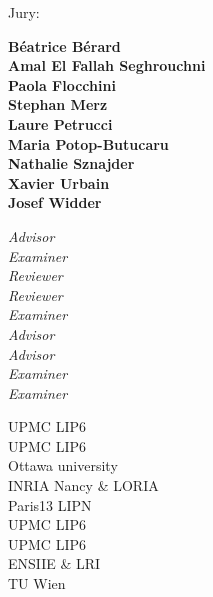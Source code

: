 \begin{titlepage}
\vfill
\begin{center}
\noindent \large
{\normalsize
\begin{flushleft}
\noindent Jury: \\
\begin{minipage}[t]{0.43\textwidth}
	\bfseries
	Béatrice Bérard\\
	Amal El Fallah Seghrouchni\\
	Paola Flocchini\\
	Stephan Merz\\
	Laure Petrucci\\
	Maria Potop-Butucaru\\
	Nathalie Sznajder\\
	Xavier Urbain\\
	Josef Widder
\end{minipage}
\begin{minipage}[t]{0.25\textwidth}
    \itshape
    Advisor\\
    Examiner\\
    Reviewer\\
    Reviewer\\
    Examiner\\
    Advisor\\
    Advisor\\
    Examiner\\
    Examiner
\end{minipage}
\begin{minipage}[t]{0.30\textwidth}
     UPMC LIP6\\
     UPMC LIP6\\
     Ottawa university \\
     INRIA Nancy \& LORIA \\
     Paris13 LIPN\\
     UPMC LIP6\\
     UPMC LIP6\\
     ENSIIE \& LRI\\
     TU Wien
\end{minipage}
\end{flushleft}
}
\end{center}
\end{titlepage}
\thispagestyle{empty}
